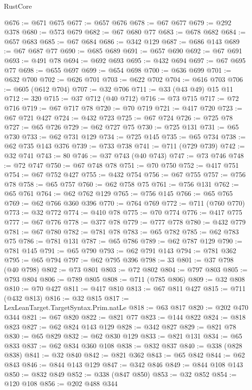 \begin{lexlean}{RustCore}
\begin{coremodule}
@676 := @671 @675
@677 := @657 @676
@678 := @67 @677
@679 := @292 @378
@680 := @573 @679
@682 := @67 @680 @77
@683 := @678 @682
@684 := @657 @683
@685 := @67 @684
@686 := @342 @129
@687 := @686 @143
@689 := @67 @687 @77
@690 := @685 @689
@691 := @657 @690
@692 := @67 @691
@693 := @491 @78
@694 := @692 @693
@695 := @432 @694
@697 := @67 @695 @77
@698 := @655 @697
@699 := @654 @698
@700 := @636 @699
@701 := @632 @700
@702 := @626 @701
@703 := @622 @702
@704 := @616 @703
@706 := @605 (@612 @704)
@707 := @32 @706
@711 := @33 (@43 @49) @15 @11
@712 := 320
@715 := @37 @712 (@40 @712)
@716 := @73 @715
@717 := @72 @716
@719 := @67 @717 @78
@720 := @70 @719
@721 := @417 @720
@723 := @67 @721 @427
@724 := @432 @723
@725 := @67 @724
@726 := @725 @78
@727 := @65 @726
@729 := @62 @727 @75
@730 := @725 @131
@731 := @65 @730
@733 := @62 @731 @129
@734 := @725 @145
@735 := @65 @734
@738 := @62 @735 @143 @376
@739 := @733 @738
@741 := @711 (@729 @739)
@742 := @32 @741
@743 := 80
@746 := @37 @743 (@40 @743)
@747 := @73 @746
@748 := @72 @747
@750 := @67 @748 @78
@751 := @70 @750
@752 := @417 @751
@754 := @67 @752 @427
@755 := @432 @754
@756 := @67 @755
@757 := @756 @78
@758 := @65 @757
@760 := @62 @758 @75
@761 := @756 @131
@762 := @65 @761
@764 := @62 @762 @129
@765 := @756 @145
@766 := @65 @765
@769 := @62 @766 @360 @396
@770 := @764 @769
@772 := @711 (@760 @770)
@773 := @32 @772
@774 := @410 @78
@775 := @70 @774
@776 := @417 @775
@777 := @67 @776
@778 := @377 @78
@779 := @777 @778
@780 := @432 @779
@781 := @67 @780
@782 := @781 @78
@783 := @65 @782
@785 := @62 @783 @75
@786 := @781 @131
@787 := @65 @786
@789 := @62 @787 @129
@790 := @781 @145
@791 := @65 @790
@793 := @62 @791 @143
@794 := @781 @362
@795 := @65 @794
@797 := @62 @795 @396
@798 := 33
@801 := @37 @798 (@40 @798)
@802 := @73 @801
@803 := @72 @802
@804 := @797 @803
@805 := @793 @804
@806 := @789 @805
@808 := @711 (@785 @806)
@809 := @32 @808
@810 := @70 @427
@811 := @417 @810
@813 := @67 @811 @427
@815 := @711 (@432 @813)
@816 := @32 @815
@817 := LexLeanTarget.TargetSyntax.Prim.natLe
@818 := @63 @817
@820 := @202 @470 @344
@821 := @67 @820
@822 := @821 @77
@823 := @144 @822
@824 := @818 @823
@827 := @62 @824 @143 @129
@828 := @342 @827
@829 := @821 @78
@830 := @65 @829
@832 := @62 @830 @129
@833 := @821 @131
@834 := @65 @833
@837 := @62 @834 @360 @108
@838 := @832 @837
@840 := @338 (@828 @838)
@841 := @32 @840
@842 := @821 @362
@843 := @65 @842
@844 := @62 @843
@846 := @844 @143 @129
@847 := @342 @846
@849 := @844 @108 @143
@850 := @832 @849
@852 := @338 (@847 @850)
@853 := @32 @852
@854 := @120 @108
@856 := @202 @488 @344

\end{coremodule}
\end{lexlean}

